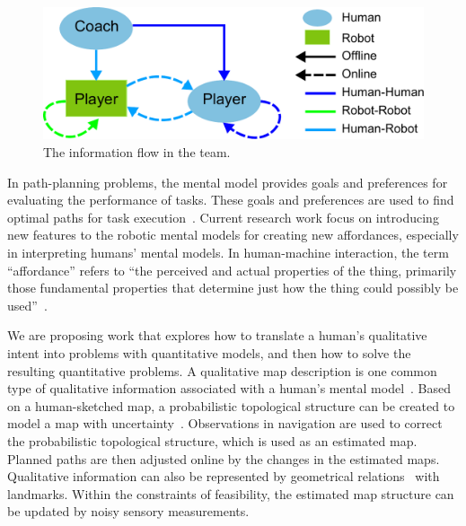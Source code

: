 \documentclass[phd]{byuprop}
\begin{document}
\begin{figure}[hbtp]
\centering
\includegraphics[width=0.6\linewidth]{./fig/team_info_flow.pdf}
\caption{The information flow in the team.}
\label{fig:team_info_flow}
\end{figure}

In path-planning problems, the mental model provides goals and preferences for evaluating the performance of tasks.
These goals and preferences are used to find optimal paths for task execution~\cite{choset2005principles}.
Current research work focus on introducing new features to the robotic mental models for creating new affordances, especially in interpreting humans' mental models.
In human-machine interaction, the term ``affordance'' refers to ``the perceived and actual properties of the thing, primarily those fundamental properties that determine just how the thing could possibly be used''~\cite{norman2013design}.

We are proposing work that explores how to translate a human's qualitative intent into problems with quantitative models, and then how to solve the resulting quantitative problems.
A qualitative map description is one common type of qualitative information associated with a human's mental model~\cite{kuipers1999}.
Based on a human-sketched map, a probabilistic topological structure can be created to model a map with uncertainty~\cite{Shah2013}.
Observations in navigation are used to correct the probabilistic topological structure, which is used as an estimated map.
Planned paths are then adjusted online by the changes in the estimated maps.
Qualitative information can also be represented by geometrical relations~\cite{mcclelland2012qualitative,mcclelland2014qualitative} with landmarks.
Within the constraints of feasibility, the estimated map structure can be updated by noisy sensory measurements.
\end{document}
